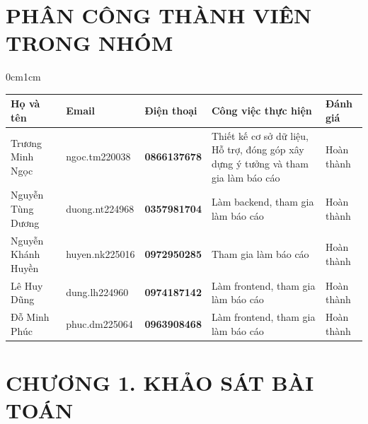 \documentclass{article}
\begin{document}
\section*{PHÂN CÔNG THÀNH VIÊN TRONG NHÓM}
\begin{adjustwidth}{0cm}{1cm} %
\resizebox{\textwidth}{!}
{ %
\begin{tabular}{|p{2.5cm}|p{3.5cm}|p{3cm}|p{4.5cm}|p{2.5cm}|}
\hline
\textbf{Họ và tên} & \textbf{Email} & \textbf{Điện thoại} & \textbf{Công việc thực hiện} & \textbf{Đánh giá} \\ 
\hline
Trương Minh Ngọc & ngoc.tm220038 & \textbf{0866137678} & Thiết kế cơ sở dữ liệu, Hỗ trợ, đóng góp xây dựng ý tưởng và tham gia làm báo cáo & Hoàn thành \\ 
\hline
Nguyễn Tùng Dương & duong.nt224968 & \textbf{0357981704} & Làm backend, tham gia làm báo cáo & Hoàn thành \\ 
\hline
Nguyễn Khánh Huyền & huyen.nk225016 & \textbf{0972950285} & Tham gia làm báo cáo & Hoàn thành \\ 
\hline
Lê Huy Dũng & dung.lh224960 & \textbf{0974187142} & Làm frontend, tham gia làm báo cáo & Hoàn thành \\ 
\hline
Đỗ Minh Phúc & phuc.dm225064 & \textbf{0963908468} & Làm frontend, tham gia làm báo cáo & Hoàn thành \\ 
\hline
\end{tabular}
}
\end{adjustwidth}
\newpage

\section*{CHƯƠNG 1. KHẢO SÁT BÀI TOÁN}
\setcounter{section}{1}
\end{document}

